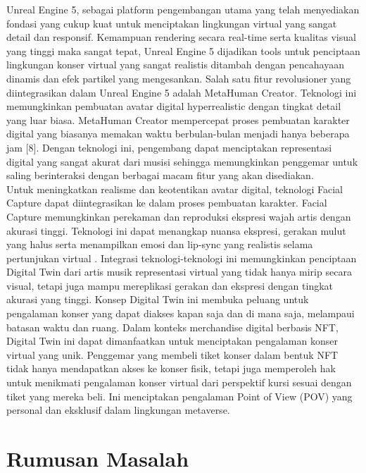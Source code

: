 Unreal Engine 5, sebagai platform pengembangan utama yang telah menyediakan fondasi yang cukup kuat untuk menciptakan
lingkungan virtual yang sangat detail dan responsif. Kemampuan rendering secara real-time serta kualitas visual yang
tinggi maka sangat tepat, Unreal Engine 5 dijadikan tools untuk penciptaan lingkungan konser virtual yang sangat 
realistis ditambah dengan pencahayaan dinamis dan efek partikel yang mengesankan. Salah satu fitur revolusioner yang
diintegrasikan dalam Unreal Engine 5 adalah MetaHuman Creator. Teknologi ini memungkinkan pembuatan avatar digital 
hyperrealistic dengan tingkat detail yang luar biasa. MetaHuman Creator mempercepat proses pembuatan karakter digital
yang biasanya memakan waktu berbulan-bulan menjadi hanya beberapa jam [8]. Dengan teknologi ini, pengembang dapat 
menciptakan representasi digital yang sangat akurat dari musisi sehingga memungkinkan penggemar untuk saling  
berinteraksi dengan berbagai macam fitur yang akan disediakan.
\\

Untuk meningkatkan realisme dan keotentikan avatar digital, teknologi Facial Capture dapat diintegrasikan ke dalam
proses pembuatan karakter. Facial Capture memungkinkan perekaman dan reproduksi ekspresi wajah artis dengan akurasi
tinggi. Teknologi ini dapat menangkap nuansa ekspresi, gerakan mulut yang halus serta menampilkan emosi dan lip-sync
yang realistis selama pertunjukan virtual \parencite{Zeng2020}. Integrasi teknologi-teknologi ini memungkinkan penciptaan Digital
Twin dari artis musik \- representasi virtual yang tidak hanya mirip secara visual, tetapi juga mampu mereplikasi
gerakan dan ekspresi dengan tingkat akurasi yang tinggi. Konsep Digital Twin ini membuka peluang untuk pengalaman
konser yang dapat diakses kapan saja dan di mana saja, melampaui batasan waktu dan ruang. Dalam konteks merchandise digital
berbasis NFT, Digital Twin ini dapat dimanfaatkan untuk menciptakan pengalaman konser virtual yang unik. Penggemar yang
membeli tiket konser dalam bentuk NFT tidak hanya mendapatkan akses ke konser fisik, tetapi juga memperoleh hak untuk
menikmati pengalaman konser virtual dari perspektif kursi sesuai dengan tiket yang mereka beli. Ini menciptakan pengalaman
Point of View (POV) yang personal dan eksklusif dalam lingkungan metaverse.



\section{Rumusan Masalah}

